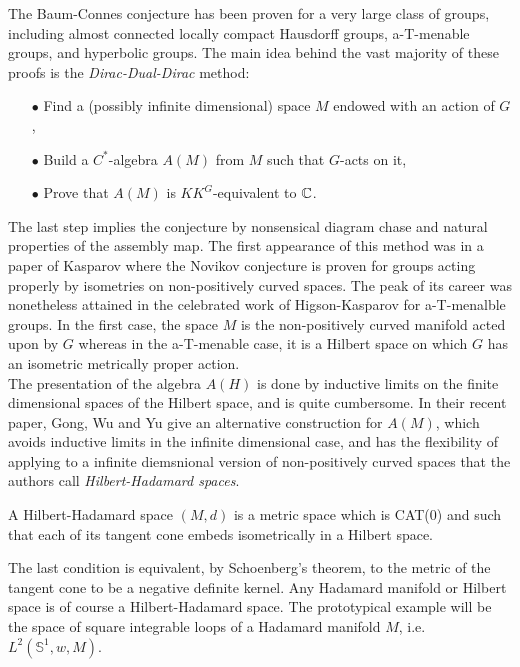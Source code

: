 The Baum-Connes conjecture has been proven for a very large class of groups, including almost connected locally compact Hausdorff groups, a-T-menable groups, and hyperbolic groups. The main idea behind the vast majority of these proofs is the \textit{Dirac-Dual-Dirac} method:
\begin{itemize}
\item[$\bullet$] Find a (possibly infinite dimensional) space $M$ endowed with an action of $G$,
\item[$\bullet$] Build a $C^*$-algebra $A(M)$ from $M$ such that $G$-acts on it,
\item[$\bullet$] Prove that $A(M)$ is $KK^G$-equivalent to $\mathbb C$.
\end{itemize}

The last step implies the conjecture by nonsensical diagram chase and natural properties of the assembly map. The first appearance of this method was in a paper of Kasparov where the Novikov conjecture is proven for groups acting properly by isometries on non-positively curved spaces. The peak of its career was nonetheless attained in the celebrated work of Higson-Kasparov for a-T-menalble groups. In the first case, the space $M$ is the non-positively curved manifold acted upon by $G$ whereas in the a-T-menable case, it is a Hilbert space on which $G$ has an isometric metrically proper action.\\

The presentation of the algebra $A(H)$ is done by inductive limits on the finite dimensional spaces of the Hilbert space, and is quite cumbersome. In their recent paper, Gong, Wu and Yu give an alternative construction for $A(M)$, which avoids inductive limits in the infinite dimensional case, and has the flexibility of applying to a infinite diemsnional version of non-positively curved spaces that the authors call \textit{Hilbert-Hadamard spaces}.

\begin{definition}
A Hilbert-Hadamard space $(M,d)$ is a metric space which is CAT(0) and such that each of its tangent cone embeds isometrically in a Hilbert space. 
\end{definition}

The last condition is equivalent, by Schoenberg's theorem, to the metric of the tangent cone to be a negative definite kernel. Any Hadamard manifold or Hilbert space is of course a Hilbert-Hadamard space. The prototypical example will be the space of square integrable loops of a Hadamard manifold $M$, i.e. $L^2(\mathbb S^1, w, M)$. \\

